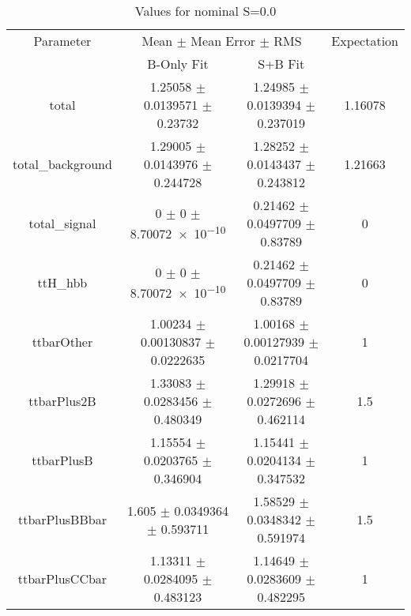 \begin{table}
\centering
\caption{Values for nominal S=0.0}
\begin{tabular}{cccc}
\toprule
Parameter & \multicolumn{2}{c}{Mean $\pm$ Mean Error $\pm$ RMS} & Expectation\\
 & B-Only Fit & S+B Fit & \\
\midrule
total & \num{1.25058} $\pm$ \num{0.0139571} $\pm$ \num{0.23732} & \num{1.24985} $\pm$ \num{0.0139394} $\pm$ \num{0.237019} & \num{1.16078}\\
total\_background & \num{1.29005} $\pm$ \num{0.0143976} $\pm$ \num{0.244728} & \num{1.28252} $\pm$ \num{0.0143437} $\pm$ \num{0.243812} & \num{1.21663}\\
total\_signal & \num{0} $\pm$ \num{0} $\pm$ \num{8.70072e-10} & \num{0.21462} $\pm$ \num{0.0497709} $\pm$ \num{0.83789} & \num{0}\\
ttH\_hbb & \num{0} $\pm$ \num{0} $\pm$ \num{8.70072e-10} & \num{0.21462} $\pm$ \num{0.0497709} $\pm$ \num{0.83789} & \num{0}\\
ttbarOther & \num{1.00234} $\pm$ \num{0.00130837} $\pm$ \num{0.0222635} & \num{1.00168} $\pm$ \num{0.00127939} $\pm$ \num{0.0217704} & \num{1}\\
ttbarPlus2B & \num{1.33083} $\pm$ \num{0.0283456} $\pm$ \num{0.480349} & \num{1.29918} $\pm$ \num{0.0272696} $\pm$ \num{0.462114} & \num{1.5}\\
ttbarPlusB & \num{1.15554} $\pm$ \num{0.0203765} $\pm$ \num{0.346904} & \num{1.15441} $\pm$ \num{0.0204134} $\pm$ \num{0.347532} & \num{1}\\
ttbarPlusBBbar & \num{1.605} $\pm$ \num{0.0349364} $\pm$ \num{0.593711} & \num{1.58529} $\pm$ \num{0.0348342} $\pm$ \num{0.591974} & \num{1.5}\\
ttbarPlusCCbar & \num{1.13311} $\pm$ \num{0.0284095} $\pm$ \num{0.483123} & \num{1.14649} $\pm$ \num{0.0283609} $\pm$ \num{0.482295} & \num{1}\\
\bottomrule
\end{tabular}
\end{table}